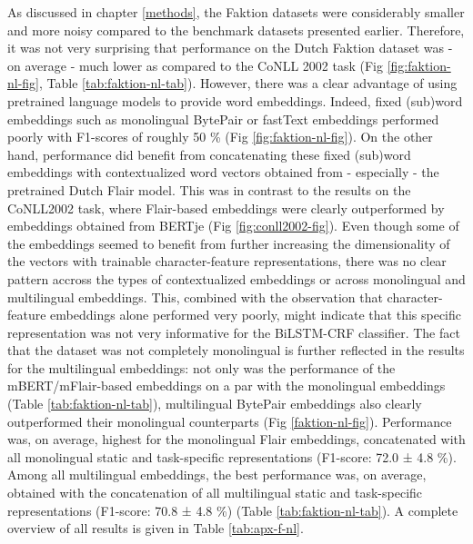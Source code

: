 \documentclass[12pt,a4paper,]{book}
\begin{document}
As discussed in chapter \ref{methods}, the Faktion datasets were considerably smaller and more noisy compared to the benchmark datasets presented earlier. Therefore, it was not very surprising that performance on the Dutch Faktion dataset was - on average - much lower as compared to the CoNLL 2002 task (Fig \ref{fig:faktion-nl-fig}, Table \ref{tab:faktion-nl-tab}). However, there was a clear advantage of using pretrained language models to provide word embeddings. Indeed, fixed (sub)word embeddings such as monolingual BytePair or fastText embeddings performed poorly with F1-scores of roughly 50 \% (Fig \ref{fig:faktion-nl-fig}). On the other hand, performance did benefit from concatenating these fixed (sub)word embeddings with contextualized word vectors obtained from - especially - the pretrained Dutch Flair model. This was in contrast to the results on the CoNLL2002 task, where Flair-based embeddings were clearly outperformed by embeddings obtained from BERTje (Fig \ref{fig:conll2002-fig}). Even though some of the embeddings seemed to benefit from further increasing the dimensionality of the vectors with trainable character-feature representations, there was no clear pattern accross the types of contextualized embeddings or across monolingual and multilingual embeddings. This, combined with the observation that character-feature embeddings alone performed very poorly, might indicate that this specific representation was not very informative for the BiLSTM-CRF classifier. The fact that the dataset was not completely monolingual is further reflected in the results for the multilingual embeddings: not only was the performance of the mBERT/mFlair-based embeddings on a par with the monolingual embeddings (Table \ref{tab:faktion-nl-tab}), multilingual BytePair embeddings also clearly outperformed their monolingual counterparts (Fig \ref{faktion-nl-fig}). Performance was, on average, highest for the monolingual Flair embeddings, concatenated with all monolingual static and task-specific representations (F1-score: 72.0 ± 4.8 \%). Among all multilingual embeddings, the best performance was, on average, obtained with the concatenation of all multilingual static and task-specific representations (F1-score: 70.8 ± 4.8 \%) (Table \ref{tab:faktion-nl-tab}). A complete overview of all results is given in Table \ref{tab:apx-f-nl}.
\end{document}
